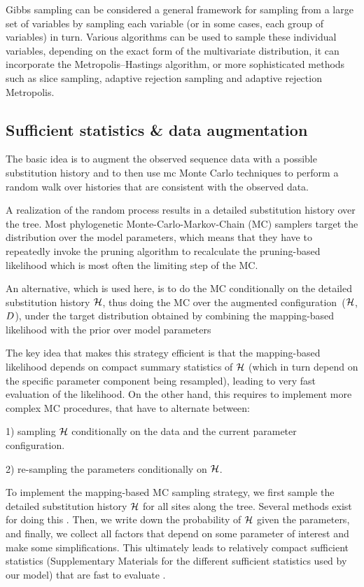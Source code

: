 Gibbs sampling can be considered a general framework for sampling from a large set of variables by sampling each variable (or in some cases, each group of variables) in turn.
Various algorithms can be used to sample these individual variables, depending on the exact form of the multivariate distribution, it can incorporate the Metropolis–Hastings algorithm, or more sophisticated methods such as slice sampling, adaptive rejection sampling and adaptive rejection Metropolis.

\subsection{Sufficient statistics \& data augmentation}

The basic idea is to augment the observed sequence data with a possible \gls{substitution} history and to then use \gls{mc} Monte Carlo techniques to perform a random walk over histories that are consistent with the observed data.

A realization of the random process results in a detailed \gls{substitution} history over the tree.
Most phylogenetic Monte-Carlo-Markov-Chain (\acrshort{MC}) samplers target the distribution over the model parameters, which means that they have to repeatedly invoke the pruning algorithm to recalculate
the pruning-based \gls{likelihood} which is most often the limiting step of the \acrshort{MC}.

An alternative, which is used here, is to do the \acrshort{MC} conditionally on the detailed \gls{substitution} history $\mathcal{H}$, thus doing the \acrshort{MC} over the augmented configuration~($\mathcal{H}$, $D$), under the target distribution obtained by combining the mapping-based \gls{likelihood} with the \gls{prior} over model parameters

The key idea that makes this strategy efficient is that the mapping-based \gls{likelihood} depends on
compact summary statistics of $\mathcal{H}$ (which in turn depend on the specific parameter component
being resampled), leading to very fast evaluation of the \gls{likelihood}.
On the other hand, this requires to implement more complex \acrshort{MC} procedures, that have to alternate between:

1) sampling $\mathcal{H}$ conditionally on the data and the current parameter configuration.

2) re-sampling the parameters conditionally on $\mathcal{H}$.

To implement the mapping-based \acrshort{MC} sampling strategy, we first sample the detailed \gls{substitution} history $\mathcal{H}$ for all sites along the tree.
Several methods exist for doing this \citep{Nielsen2002,Rodrigue2008}.
Then, we write down the probability of $\mathcal{H}$ given the parameters, and finally, we collect all factors that depend on some parameter of interest and make some simplifications.
This ultimately leads to relatively compact sufficient statistics (Supplementary Materials for the different sufficient statistics used by our model) that are fast to evaluate \citep{Irvahn2014,Davydov2016}.


